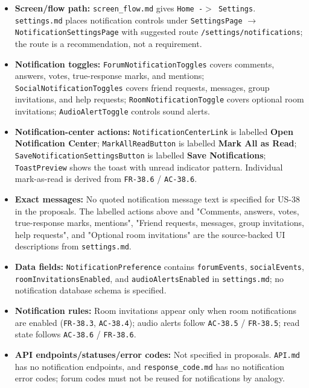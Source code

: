\documentclass[12pt]{article}
\begin{document}
\begin{itemize}
\item \textbf{Screen/flow path:} \texttt{screen\_flow.md} gives \texttt{Home -$>$ Settings}. \texttt{settings.md} places notification controls under \texttt{SettingsPage} $\rightarrow$ \texttt{NotificationSettingsPage} with suggested route \texttt{/settings/notifications}; the route is a recommendation, not a requirement.
\item \textbf{Notification toggles:} \texttt{ForumNotificationToggles} covers comments, answers, votes, true-response marks, and mentions; \texttt{SocialNotificationToggles} covers friend requests, messages, group invitations, and help requests; \texttt{RoomNotificationToggle} covers optional room invitations; \texttt{AudioAlertToggle} controls sound alerts.
\item \textbf{Notification-center actions:} \texttt{NotificationCenterLink} is labelled \textbf{Open Notification Center}; \texttt{MarkAllReadButton} is labelled \textbf{Mark All as Read}; \texttt{SaveNotificationSettingsButton} is labelled \textbf{Save Notifications}; \texttt{ToastPreview} shows the toast with unread indicator pattern. Individual mark-as-read is derived from \texttt{FR-38.6} / \texttt{AC-38.6}.
\item \textbf{Exact messages:} No quoted notification message text is specified for US-38 in the proposals. The labelled actions above and "Comments, answers, votes, true-response marks, mentions", "Friend requests, messages, group invitations, help requests", and "Optional room invitations" are the source-backed UI descriptions from \texttt{settings.md}.
\item \textbf{Data fields:} \texttt{NotificationPreference} contains \texttt{forumEvents}, \texttt{socialEvents}, \texttt{roomInvitationsEnabled}, and \texttt{audioAlertsEnabled} in \texttt{settings.md}; no notification database schema is specified.
\item \textbf{Notification rules:} Room invitations appear only when room notifications are enabled (\texttt{FR-38.3}, \texttt{AC-38.4}); audio alerts follow \texttt{AC-38.5} / \texttt{FR-38.5}; read state follows \texttt{AC-38.6} / \texttt{FR-38.6}.
\item \textbf{API endpoints/statuses/error codes:} Not specified in proposals. \texttt{API.md} has no notification endpoints, and \texttt{response\_code.md} has no notification error codes; forum codes must not be reused for notifications by analogy.
\end{itemize}
\par\medskip
\end{document}
